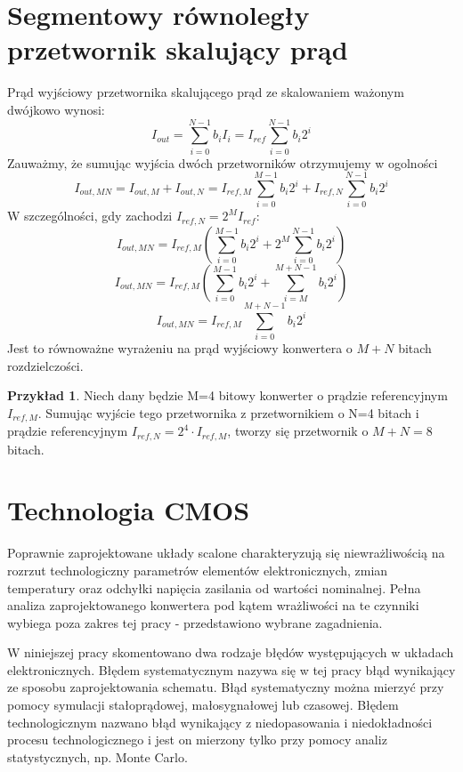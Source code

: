 \documentclass[10pt,a4paper,twoside]{report}
\theoremstyle{definition}
\theoremstyle{definition}
\theoremstyle{definition}
\newtheorem{przyklad}{Przykład}[section]
\theoremstyle{definition}
\theoremstyle{definition}
\begin{document}
	\section{Segmentowy równoległy przetwornik skalujący prąd}
{	Prąd wyjściowy przetwornika skalującego prąd ze skalowaniem ważonym dwójkowo wynosi:
	\begin{equation}
	I_{out} = \sum_{i=0}^{N-1} b_i I_{i} = I_{ref} \sum_{i=0}^{N-1} b_i 2^{i}
	\end{equation}
	Zauważmy, że sumując wyjścia dwóch przetworników otrzymujemy w ogolności
	\begin{equation}
	I_{out,MN} = I_{out,M} + I_{out,N}
	= I_{ref,M} \sum_{i=0}^{M-1} b_i 2^{i} + I_{ref,N} \sum_{i=0}^{N-1} b_i 2^{i}
	\end{equation}
	W szczególności, gdy zachodzi $I_{ref,N} = 2^M I_{ref} $:
	\begin{equation}
	I_{out,MN} = I_{ref,M}\left(\sum_{i=0}^{M-1} b_i 2^{i} + 2^M \sum_{i=0}^{N-1} b_i 2^{i}\right) 
	\end{equation}
	\begin{equation}
	I_{out,MN} = I_{ref,M}\left(\sum_{i=0}^{M-1} b_i 2^{i} + \sum_{i=M}^{M+N-1} b_i 2^{i}\right) 
	\end{equation}
	\begin{equation}
	I_{out,MN} = I_{ref,M} \sum_{i=0}^{M+N-1} b_i 2^{i}
	\end{equation}
	Jest to równoważne wyrażeniu na prąd wyjściowy konwertera o $M+N$ bitach rozdzielczości.
	\begin{przyklad}{Niech dany będzie M=4 bitowy konwerter o prądzie referencyjnym $I_{ref,M}$. Sumując wyjście tego przetwornika z przetwornikiem o N=4 bitach i prądzie referencyjnym $ I_{ref,N} = 2^4 \cdot I_{ref,M} $, tworzy się przetwornik o $M+N=8$ bitach.}
	\end{przyklad}	
}

	\section{Technologia CMOS}
	{	Poprawnie zaprojektowane układy scalone charakteryzują się niewrażliwością na rozrzut technologiczny parametrów elementów elektronicznych, zmian temperatury oraz odchyłki napięcia zasilania od wartości nominalnej. Pełna analiza zaprojektowanego konwertera pod kątem wrażliwości na te czynniki wybiega poza zakres tej pracy - przedstawiono wybrane zagadnienia. }

	{	W niniejszej pracy skomentowano dwa rodzaje błędów występujących w układach elektronicznych. Błędem systematycznym nazywa się w tej pracy błąd wynikający ze sposobu zaprojektowania schematu. Błąd systematyczny można mierzyć przy pomocy symulacji stałoprądowej, małosygnałowej lub czasowej. Błędem technologicznym nazwano błąd wynikający z niedopasowania i niedokładności procesu technologicznego i jest on mierzony tylko przy pomocy analiz statystycznych, np. Monte Carlo.}
\end{document}
